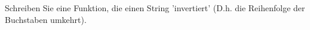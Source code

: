 \begin{aufg}[0]
Schreiben Sie eine Funktion, die einen String 'invertiert' (D.h. die Reihenfolge der Buchstaben umkehrt).
\end{aufg}
